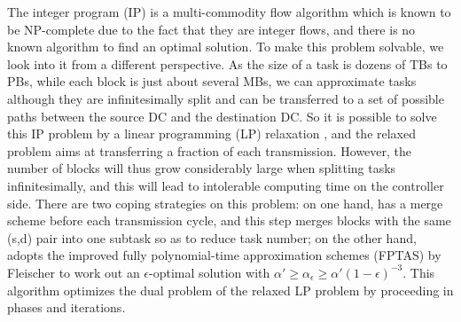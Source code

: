 The integer program (IP) is a multi-commodity flow algorithm which is known to be NP-complete \cite{garg1997primal} due to the fact that they are integer flows, and there is no known algorithm to find an optimal solution. To make this problem solvable, we look into it from a different perspective. As the size of a task is dozens of TBs to PBs, while each block is just about several MBs, we can approximate tasks although they are infinitesimally split and can be transferred to a set of possible paths between the source DC and the destination DC. So it is possible to solve this IP problem by a linear programming (LP) relaxation \cite{garg2007faster,reed2012traffic}, and the relaxed problem aims at transferring a fraction of each transmission. However, the number of blocks will thus grow considerably large when splitting tasks infinitesimally, and this will lead to intolerable computing time on the controller side. There are two coping strategies on this problem: on one hand, \name has a merge scheme before each transmission cycle, and this step merges blocks with the same (s,d) pair into one subtask so as to reduce task number; on the other hand, \name adopts the improved fully polynomial-time approximation schemes (FPTAS) by Fleischer \cite{fleischer2000approximating} to work out an $\epsilon$-optimal solution with $\alpha' \geq \alpha_\epsilon \geq \alpha'(1-\epsilon)^{-3}$. This algorithm optimizes the dual problem of the relaxed LP problem by proceeding in phases and iterations.

